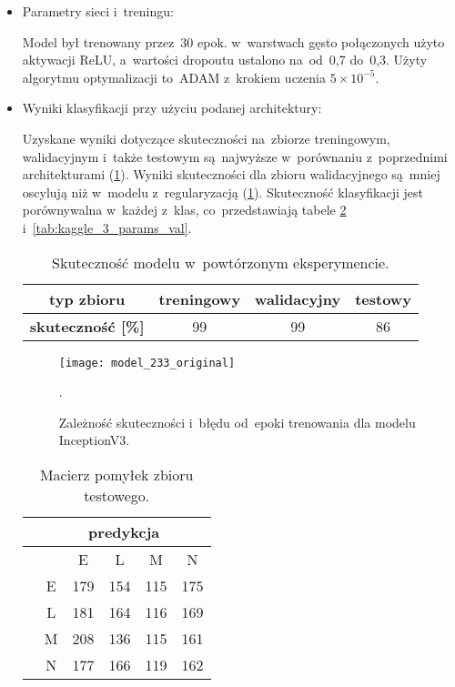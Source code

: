 {\begin{itemize}
\item Parametry sieci i~treningu:

Model był trenowany przez~30 epok. w~warstwach gęsto połączonych użyto aktywacji ReLU, a~wartości dropoutu ustalono na~od~0,7 do~0,3. Użyty algorytmu optymalizacji to~ADAM z~krokiem uczenia \(5 \times 10^{-5}\). 

\item Wyniki klasyfikacji przy użyciu podanej architektury:

Uzyskane wyniki dotyczące skuteczności na~zbiorze treningowym, walidacyjnym i~także testowym są~najwyższe w~porównaniu z~poprzednimi architekturami (\ref{tab:kaggle_3_acc_2}). Wyniki skuteczności dla zbioru walidacyjnego są~mniej oscylują niż w~modelu z~regularyzacją (\ref{fig:kaggle_3_acc_trening}). Skuteczność klasyfikacji jest porównywalna w~każdej z~klas, co~przedstawiają tabele \ref{tab:kaggle_3_conf_matrix} i~\ref{tab:kaggle_3_params_val}.

\begin{table}[h!]
\centering
\caption[Short Heading]{Skuteczność modelu w~powtórzonym eksperymencie.}
\label{tab:kaggle_3_acc_2}
\begin{tabular}{|c|c|c|c|}
\hline
\textbf{typ zbioru}           & \textbf{treningowy} & \textbf{walidacyjny} & \textbf{testowy} \\ \hline
\textbf{skuteczność {[}\%{]}} & 99                  & 99           & 86 \\ \hline
\end{tabular}
\end{table}

\begin{figure}[h!]
	\centering
	\centering
		\texttt{[image: model\_233\_original]}
	\caption{Zależność skuteczności i~błędu od~epoki trenowania dla modelu InceptionV3.}.
	\label{fig:kaggle_3_acc_trening}
\end{figure}

\begin{table}[h!]
\centering
\caption[Short Heading]{Macierz pomyłek zbioru testowego.}
\label{tab:kaggle_3_conf_matrix}
\begin{tabular}{|c|c|c|c|c|c|}
\hline
\textbf{}                           & \multicolumn{5}{c|}{\textbf{predykcja}} \\ \hline
{\multirow{5}{*}{\rotatebox[origin=c]{90}{\textbf{klasa}}}} &         & E       & L        & M      & N       \\ \cline{2-6} 
                                    & E       & 179       & 154      & 115      & 175      \\ \cline{2-6} 
                                    & L       & 181       & 164      & 116      & 169      \\ \cline{2-6} 
                                    & M       & 208       & 136      & 115      & 161      \\ \cline{2-6} 
                                    & N       & 177      & 166     & 119      & 162       \\ \hline
\end{tabular}
\end{table}


\end{itemize}}

